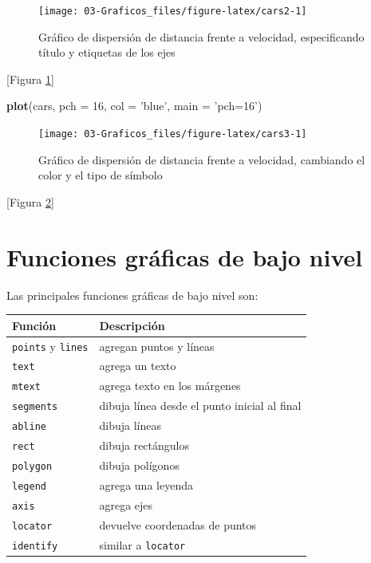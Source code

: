 \documentclass[]{book}
\newenvironment{Shaded}{\begin{snugshade}}{\end{snugshade}}
\newcommand{\KeywordTok}[1]{\textcolor[rgb]{0.13,0.29,0.53}{\textbf{#1}}}
\newcommand{\DataTypeTok}[1]{\textcolor[rgb]{0.13,0.29,0.53}{#1}}
\newcommand{\DecValTok}[1]{\textcolor[rgb]{0.00,0.00,0.81}{#1}}
\newcommand{\StringTok}[1]{\textcolor[rgb]{0.31,0.60,0.02}{#1}}
\newcommand{\NormalTok}[1]{#1}
\begin{document}
\begin{figure}[!htb]

{\centering \texttt{[image: 03-Graficos\_files/figure-latex/cars2-1]} 

}

\caption{Gráfico de dispersión de distancia frente a velocidad, especificando título y etiquetas de los ejes}\label{fig:cars2}
\end{figure}

{[}Figura \ref{fig:cars2}{]}

\begin{Shaded}
\begin{Highlighting}[]
\KeywordTok{plot}\NormalTok{(cars, }\DataTypeTok{pch =} \DecValTok{16}\NormalTok{, }\DataTypeTok{col =} \StringTok{'blue'}\NormalTok{, }\DataTypeTok{main =} \StringTok{'pch=16'}\NormalTok{)}
\end{Highlighting}
\end{Shaded}

\begin{figure}[!htb]

{\centering \texttt{[image: 03-Graficos\_files/figure-latex/cars3-1]} 

}

\caption{Gráfico de dispersión de distancia frente a velocidad, cambiando el color y el tipo de símbolo}\label{fig:cars3}
\end{figure}

{[}Figura \ref{fig:cars3}{]}

\section{Funciones gráficas de bajo
nivel}\label{funciones-graficas-de-bajo-nivel}

Las principales funciones gráficas de bajo nivel son:

\begin{longtable}[]{@{}ll@{}}
\toprule
Función & Descripción\tabularnewline
\midrule
\endhead
\texttt{points} y \texttt{lines} & agregan puntos y
líneas\tabularnewline
\texttt{text} & agrega un texto\tabularnewline
\texttt{mtext} & agrega texto en los márgenes\tabularnewline
\texttt{segments} & dibuja línea desde el punto inicial al
final\tabularnewline
\texttt{abline} & dibuja líneas\tabularnewline
\texttt{rect} & dibuja rectángulos\tabularnewline
\texttt{polygon} & dibuja polígonos\tabularnewline
\texttt{legend} & agrega una leyenda\tabularnewline
\texttt{axis} & agrega ejes\tabularnewline
\texttt{locator} & devuelve coordenadas de puntos\tabularnewline
\texttt{identify} & similar a \texttt{locator}\tabularnewline
\bottomrule
\end{longtable}
\end{document}
